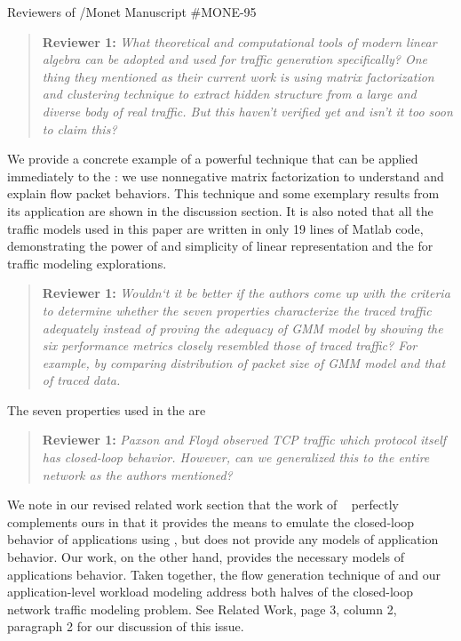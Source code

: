 \documentclass{letter}
\newenvironment{reviewer}[1]%
{\begin{quote}\textbf{Reviewer #1:} \it}{\end{quote}}
\begin{document}
\begin{letter}{Reviewers of /Monet Manuscript \#MONE-95}
\begin{reviewer}{1}
What theoretical and computational tools of modern linear algebra can be adopted and used for traffic generation specifically? One thing they mentioned as their current work is using matrix factorization and clustering technique to extract hidden structure from a large and diverse body of real traffic. But this haven’t verified yet and isn’t it too soon to claim this?
\end{reviewer}
We provide a concrete example of a powerful technique that can be applied immediately to the : we use nonnegative matrix factorization to understand and explain flow packet behaviors.
This technique and some exemplary results from its application are shown in the discussion section.
It is also noted that all the traffic models used in this paper are written in only 19 lines of Matlab code, demonstrating the power of and simplicity of linear representation and the  for traffic modeling explorations.

\begin{reviewer}{1}
Wouldn‘t it be better if the authors come up with the criteria to determine whether the seven properties characterize the traced traffic adequately instead of proving the adequacy of GMM model by showing the six performance metrics closely resembled those of traced traffic? For example, by comparing distribution of packet size of GMM model and that of traced data.
\end{reviewer}
The seven properties used in the  are %

\begin{reviewer}{1}
Paxson and Floyd observed TCP traffic which protocol itself has closed-loop behavior. However, can we generalized this to the entire network as the authors mentioned?
\end{reviewer}
We note in our revised related work section that the work of \FHC~\cite{Hernandez06:dissertation} perfectly complements ours in that it provides the means to emulate the closed-loop behavior of applications using , but does not provide any models of application behavior.
Our work, on the other hand, provides the necessary models of applications behavior.
Taken together, the  flow generation technique of \FHC and our application-level workload modeling address both halves of the closed-loop network traffic modeling problem.
See Related Work, page 3, column 2, paragraph 2 for our discussion of this issue.


\end{letter}
\end{document}
